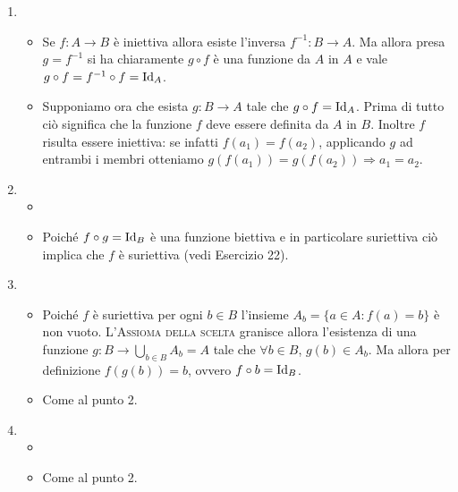 \begin{enumerate}
\item \begin{itemize}[label = $ \Rightarrow $]
  \item Se $ f \colon A \to B $ è iniettiva allora esiste l'inversa $ f^{-1} \colon B \to A $. Ma allora presa $ g = f^{-1} $ si ha chiaramente $ g \circ f $ è una funzione da $ A $ in $ A $ e vale $ g \circ f = f^{-1} \circ f = \mathrm{Id}_A $.
  \end{itemize}
  \begin{itemize}[label = $ \Leftarrow $]
  \item Supponiamo ora che esista $ g \colon B \to A $ tale che $ g \circ f = \mathrm{Id}_A $. Prima di tutto ciò significa che la funzione $ f $ deve essere definita da $ A $ in $ B $. Inoltre $ f $ risulta essere iniettiva: se infatti $ f(a_1) = f(a_2) $, applicando $ g $ ad entrambi i membri otteniamo $ g(f(a_1)) = g(f(a_2)) \Rightarrow a_1 = a_2 $.
  \end{itemize}
\item  \begin{itemize}[label = $ \Rightarrow $]
  \item
  \end{itemize}
  \begin{itemize}[label = $ \Leftarrow $]
  \item Poiché $ f \circ g = \mathrm{Id}_B $ è una funzione biettiva e in particolare suriettiva ciò implica che $ f $ è suriettiva (vedi Esercizio 22).
  \end{itemize}
\item \begin{itemize}[label = $ \Rightarrow $]
  \item Poiché $ f $ è suriettiva per ogni $ b \in B $ l'insieme $ A_b = \{a \in A : f(a) = b\} $ è non vuoto. L'\textsc{Assioma della scelta} granisce allora l'esistenza di una funzione $ g \colon B \to \bigcup_{b \in B} A_b = A $ tale che $ \forall b \in B $, $ g(b) \in A_b $. Ma allora per definizione $ f(g(b)) = b $, ovvero $ f \circ b = \mathrm{Id}_B $.
  \end{itemize}
  \begin{itemize}[label = $ \Leftarrow $]
  \item Come al punto 2.
  \end{itemize}
\item \begin{itemize}[label = $ \Rightarrow $]
  \item
  \end{itemize}
  \begin{itemize}[label = $ \Leftarrow $]
  \item Come al punto 2.
  \end{itemize}
\end{enumerate}

